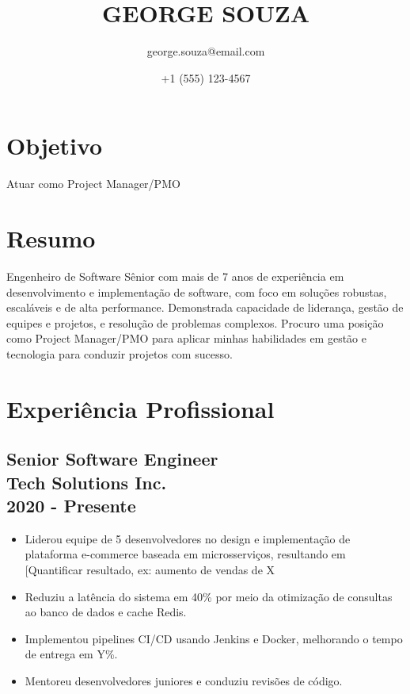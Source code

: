 \documentclass{article}
\title{GEORGE SOUZA}
\author{george.souza@email.com \and +1 (555) 123-4567}
\begin{document}
\maketitle

\section*{Objetivo}
 Atuar como Project Manager/PMO

\section*{Resumo}
 Engenheiro de Software Sênior com mais de 7 anos de experiência em desenvolvimento e implementação de software, com foco em soluções robustas, escaláveis e de alta performance.  Demonstrada capacidade de liderança, gestão de equipes e projetos, e resolução de problemas complexos.  Procuro uma posição como Project Manager/PMO para aplicar minhas habilidades em gestão e tecnologia para conduzir projetos com sucesso.

\section*{Experiência Profissional}
\subsection*{Senior Software Engineer \\ Tech Solutions Inc. \\ 2020 - Presente}
\begin{itemize}
    \item Liderou equipe de 5 desenvolvedores no design e implementação de plataforma e-commerce baseada em microsserviços, resultando em [Quantificar resultado, ex: aumento de vendas de X%
    \item Reduziu a latência do sistema em 40\% por meio da otimização de consultas ao banco de dados e cache Redis.
    \item Implementou pipelines CI/CD usando Jenkins e Docker, melhorando o tempo de entrega em Y\%.
    \item Mentoreu desenvolvedores juniores e conduziu revisões de código.
\end{itemize}
\end{document}
